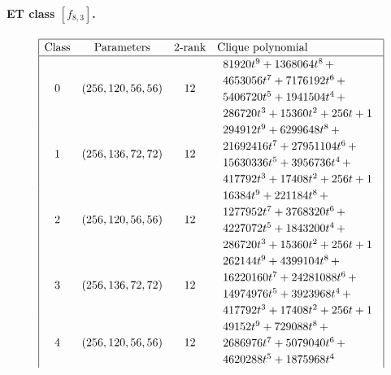 \documentclass[12pt,a4paper]{article}
\begin{document}
\paragraph*{ET class $[f_{8,3}]$.}
%
\begin{table}[!bhpt] %
\small{}
\begin{align*}
\def\arraystretch{1.2}
\begin{array}{|cccl|}
\hline
\text{Class} &
\text{Parameters} &
\text{2-rank} &
\text{Clique polynomial}
\\
\hline
0 &
(256, 120, 56, 56) &
12 &
\begin{array}{l}
81920t^{9} + 1368064t^{8}
\,+
\\
 4653056t^{7} + 7176192t^{6}
\,+
\\
 5406720t^{5} + 1941504t^{4}
\,+
\\
 286720t^{3} + 15360t^{2} + 256t + 1
\end{array}
\\
1 &
(256, 136, 72, 72) &
12 &
\begin{array}{l}
294912t^{9} + 6299648t^{8}
\,+
\\
 21692416t^{7} + 27951104t^{6}
\,+
\\
 15630336t^{5} + 3956736t^{4}
\,+
\\
 417792t^{3} + 17408t^{2} + 256t + 1
\end{array}
\\
2 &
(256, 120, 56, 56) &
12 &
\begin{array}{l}
16384t^{9} + 221184t^{8}
\,+
\\
 1277952t^{7} + 3768320t^{6}
\,+
\\
 4227072t^{5} + 1843200t^{4}
\,+
\\
 286720t^{3} + 15360t^{2} + 256t + 1
\end{array}
\\
3 &
(256, 136, 72, 72) &
12 &
\begin{array}{l}
262144t^{9} + 4399104t^{8}
\,+
\\
 16220160t^{7} + 24281088t^{6}
\,+
\\
 14974976t^{5} + 3923968t^{4}
\,+
\\
 417792t^{3} + 17408t^{2} + 256t + 1
\end{array}
\\
4 &
(256, 120, 56, 56) &
12 &
\begin{array}{l}
49152t^{9} + 729088t^{8}
\,+
\\
 2686976t^{7} + 5079040t^{6}
\,+
\\
 4620288t^{5} + 1875968t^{4}

\end{array}
\end{array}
\end{align*}
\end{table}
\end{document}
